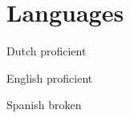 \section*{Languages}

	\begin{languageList}
		\item[Dutch] proficient
		\item[English] proficient
    \item[Spanish] broken
	\end{languageList}
